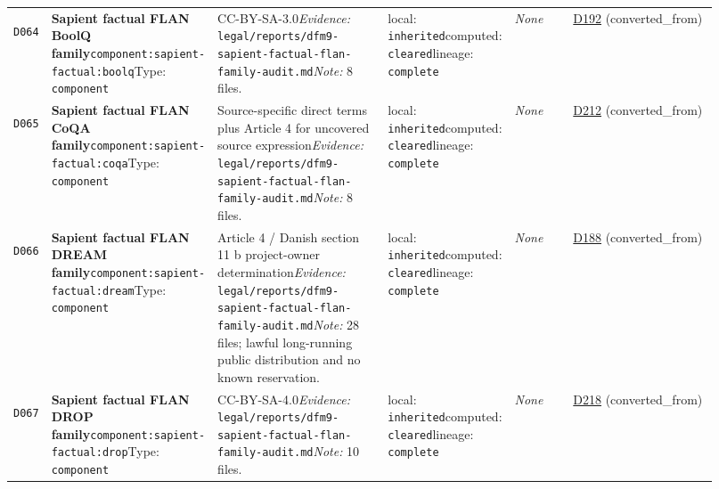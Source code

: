 \documentclass[9pt,a4paper]{article}
\newcommand{\depid}[1]{\hypertarget{dep:#1}{\texttt{#1}}}
\begin{document}
\begin{landscape}
\begin{longtable}{@{}L{0.035\linewidth}L{0.185\linewidth}L{0.27\linewidth}L{0.09\linewidth}L{0.10\linewidth}L{0.24\linewidth}@{}}
\depid{D064} & \textbf{Sapient factual FLAN BoolQ family}\newline \nolinkurl{component:sapient-factual:boolq}\newline Type: \texttt{component} & CC-BY-SA-3.0\newline \textit{Evidence:} \nolinkurl{legal/reports/dfm9-sapient-factual-flan-family-audit.md}\newline \textit{Note:} 8 files. & local: \texttt{inherited}\newline computed: \texttt{cleared}\newline lineage: \texttt{complete} & \textit{None} & \hyperlink{dep:D192}{D192} (converted\_from) \\
\depid{D065} & \textbf{Sapient factual FLAN CoQA family}\newline \nolinkurl{component:sapient-factual:coqa}\newline Type: \texttt{component} & Source-specific direct terms plus Article 4 for uncovered source expression\newline \textit{Evidence:} \nolinkurl{legal/reports/dfm9-sapient-factual-flan-family-audit.md}\newline \textit{Note:} 8 files. & local: \texttt{inherited}\newline computed: \texttt{cleared}\newline lineage: \texttt{complete} & \textit{None} & \hyperlink{dep:D212}{D212} (converted\_from) \\
\depid{D066} & \textbf{Sapient factual FLAN DREAM family}\newline \nolinkurl{component:sapient-factual:dream}\newline Type: \texttt{component} & Article 4 / Danish section 11 b project-owner determination\newline \textit{Evidence:} \nolinkurl{legal/reports/dfm9-sapient-factual-flan-family-audit.md}\newline \textit{Note:} 28 files; lawful long-running public distribution and no known reservation. & local: \texttt{inherited}\newline computed: \texttt{cleared}\newline lineage: \texttt{complete} & \textit{None} & \hyperlink{dep:D188}{D188} (converted\_from) \\
\depid{D067} & \textbf{Sapient factual FLAN DROP family}\newline \nolinkurl{component:sapient-factual:drop}\newline Type: \texttt{component} & CC-BY-SA-4.0\newline \textit{Evidence:} \nolinkurl{legal/reports/dfm9-sapient-factual-flan-family-audit.md}\newline \textit{Note:} 10 files. & local: \texttt{inherited}\newline computed: \texttt{cleared}\newline lineage: \texttt{complete} & \textit{None} & \hyperlink{dep:D218}{D218} (converted\_from) \\

\end{longtable}
\end{landscape}
\end{document}
